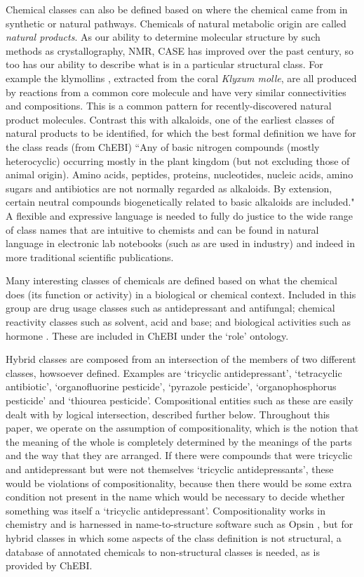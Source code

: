 \documentclass[10pt]{bmc_article}
\newenvironment{bmcformat}{\baselineskip20pt\sloppy\setboolean{publ}{false}}{\baselineskip20pt\sloppy}
\begin{document}
\begin{bmcformat}
Chemical classes can also be defined based on where the chemical came from in synthetic or natural pathways. Chemicals of natural metabolic origin are called \textit{natural products}.  As our ability to determine molecular structure by such methods as crystallography, NMR, CASE has improved over the past century, so too has our ability to describe what is in a particular structural class.  For example the klymollins \cite{hsu2011}, extracted from the coral \textit{Klyxum molle}, are all produced by reactions from a common core molecule and have very similar connectivities and compositions. This is a common pattern for recently-discovered natural product molecules.  Contrast this with alkaloids, one of the earliest classes of natural products to be identified, for which the best formal definition we have for the class reads (from ChEBI) ``Any of basic nitrogen compounds (mostly heterocyclic) occurring mostly in the plant kingdom (but not excluding those of animal origin). Amino acids, peptides, proteins, nucleotides, nucleic acids, amino sugars and antibiotics are not normally regarded as alkaloids. By extension, certain neutral compounds biogenetically related to basic alkaloids are included." A flexible and expressive language is needed to fully do justice to the wide range of class names that are intuitive to chemists and can be found in natural language in electronic lab notebooks (such as are used in industry) and indeed in more traditional scientific publications. 

Many interesting classes of chemicals are defined based on what the chemical does (its function or activity) in a biological or chemical context. Included in this group are drug usage classes such as antidepressant and antifungal; chemical reactivity classes such as solvent, acid and base; and biological activities such as hormone \cite{batchelor2010}. These are included in ChEBI under the `role' ontology. 

Hybrid classes are composed from an intersection of the members of two different classes, howsoever defined.  Examples are `tricyclic antidepressant', `tetracyclic antibiotic', `organofluorine pesticide', `pyrazole pesticide', `organophosphorus pesticide' and `thiourea pesticide'. Compositional entities such as these are easily dealt with by logical intersection, described further below. 
Throughout this paper, we operate on the assumption of compositionality, which is the notion that the meaning of the whole is completely
determined by the meanings of the parts and the way that they are arranged.
If there were compounds that were tricyclic and antidepressant but were not themselves `tricyclic antidepressants', these would be violations of compositionality, because then there would be some extra condition not present in the name which would be necessary to decide whether something was itself a `tricyclic antidepressant'.
Compositionality works in chemistry and is harnessed in name-to-structure software such as Opsin \cite{lowe2011}, but for hybrid classes in which some aspects of the class definition is not structural, a database of annotated chemicals to non-structural classes is needed, as is provided by ChEBI. 


\end{bmcformat}
\end{document}
